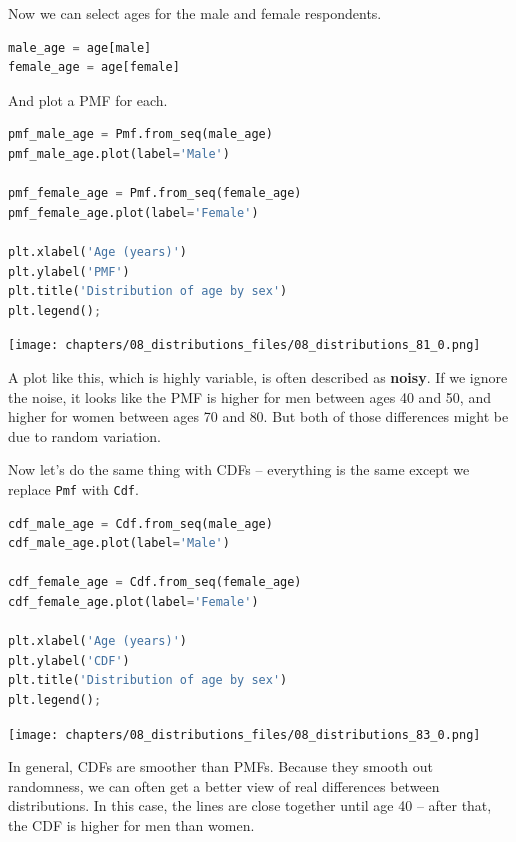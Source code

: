 Now we can select ages for the male and female respondents.

\begin{lstlisting}[language=Python,style=source]
male_age = age[male]
female_age = age[female]
\end{lstlisting}

And plot a PMF for each.

\begin{lstlisting}[language=Python,style=source]
pmf_male_age = Pmf.from_seq(male_age)
pmf_male_age.plot(label='Male')

pmf_female_age = Pmf.from_seq(female_age)
pmf_female_age.plot(label='Female')

plt.xlabel('Age (years)') 
plt.ylabel('PMF')
plt.title('Distribution of age by sex')
plt.legend();
\end{lstlisting}

\begin{center}
\texttt{[image: chapters/08\_distributions\_files/08\_distributions\_81\_0.png]}
\end{center}

A plot like this, which is highly variable, is often described as
\textbf{noisy}. If we ignore the noise, it looks like the PMF is higher
for men between ages 40 and 50, and higher for women between ages 70 and
80. But both of those differences might be due to random variation.

Now let's do the same thing with CDFs -- everything is the same except
we replace \passthrough{\lstinline!Pmf!} with
\passthrough{\lstinline!Cdf!}.

\begin{lstlisting}[language=Python,style=source]
cdf_male_age = Cdf.from_seq(male_age)
cdf_male_age.plot(label='Male')

cdf_female_age = Cdf.from_seq(female_age)
cdf_female_age.plot(label='Female')

plt.xlabel('Age (years)') 
plt.ylabel('CDF')
plt.title('Distribution of age by sex')
plt.legend();
\end{lstlisting}

\begin{center}
\texttt{[image: chapters/08\_distributions\_files/08\_distributions\_83\_0.png]}
\end{center}

In general, CDFs are smoother than PMFs. Because they smooth out
randomness, we can often get a better view of real differences between
distributions. In this case, the lines are close together until age 40
-- after that, the CDF is higher for men than women.

